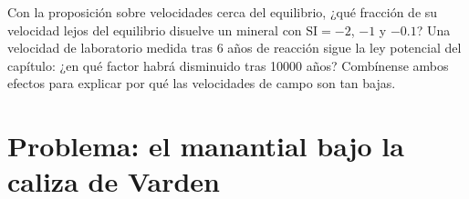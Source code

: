 \begin{exercise}[$\star\star\star$]\label{exo:b3:water-rock-interaction:12}
Con la proposición sobre velocidades cerca del equilibrio, ¿qué fracción de su
velocidad lejos del equilibrio disuelve un mineral con $\mathrm{SI} =
-2$, $-1$ y $-0.1$? Una velocidad de laboratorio medida tras 6 años de reacción
sigue la ley potencial del capítulo: ¿en qué factor habrá disminuido
tras \num{10000} años? Combínense ambos efectos para explicar por qué las velocidades de
campo son tan bajas.
\end{exercise}

\section{Problema: el manantial bajo la caliza de Varden}

